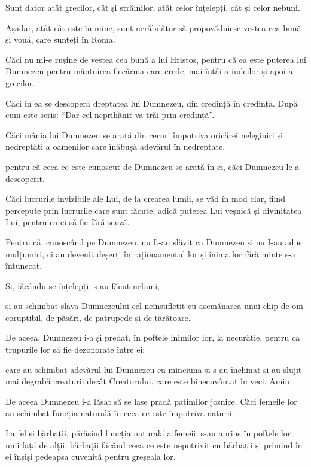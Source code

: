 {Sunt dator atât grecilor, cât și străinilor, atât celor înțelepți, cât și celor nebuni.

Așadar, atât cât este în mine, sunt nerăbdător să propovăduiesc vestea cea bună și vouă, care sunteți în Roma.


\par }{\PP {}Căci nu mi-e rușine de vestea cea bună a lui Hristos, pentru că ea este puterea lui Dumnezeu pentru mântuirea fiecăruia care crede, mai întâi a iudeilor și apoi a grecilor.

Căci în ea se descoperă dreptatea lui Dumnezeu, din credință în credință. După cum este scris: “Dar cel neprihănit va trăi prin credință”.


\par }{\PP {}Căci mânia lui Dumnezeu se arată din ceruri împotriva oricărei nelegiuiri și nedreptăți a oamenilor care înăbușă adevărul în nedreptate,

pentru că ceea ce este cunoscut de Dumnezeu se arată în ei, căci Dumnezeu le-a descoperit.

Căci lucrurile invizibile ale Lui, de la crearea lumii, se văd în mod clar, fiind percepute prin lucrurile care sunt făcute, adică puterea Lui veșnică și divinitatea Lui, pentru ca ei să fie fără scuză.

Pentru că, cunoscând pe Dumnezeu, nu L-au slăvit ca Dumnezeu și nu I-au adus mulțumiri, ci au devenit deșerți în raționamentul lor și inima lor fără minte s-a întunecat.


\par }{\PP {}Și, făcându-se înțelepți, s-au făcut nebuni,

și au schimbat slava Dumnezeului cel neînsuflețit cu asemănarea unui chip de om coruptibil, de păsări, de patrupede și de târâtoare.

De aceea, Dumnezeu i-a și predat, în poftele inimilor lor, la necurăție, pentru ca trupurile lor să fie dezonorate între ei;

care au schimbat adevărul lui Dumnezeu cu minciuna și s-au închinat și au slujit mai degrabă creaturii decât Creatorului, care este binecuvântat în veci. Amin.


\par }{\PP {}De aceea Dumnezeu i-a lăsat să se lase pradă patimilor josnice. Căci femeile lor au schimbat funcția naturală în ceea ce este împotriva naturii.

La fel și bărbații, părăsind funcția naturală a femeii, s-au aprins în poftele lor unii față de alții, bărbații făcând ceea ce este nepotrivit cu bărbații și primind în ei înșiși pedeapsa cuvenită pentru greșeala lor.

}
